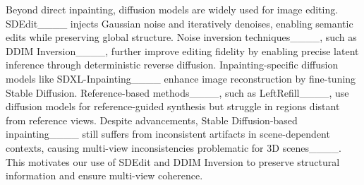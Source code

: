 
\vspace{3pt}
Beyond direct inpainting, diffusion models are widely used for image editing. SDEdit____ injects Gaussian noise and iteratively denoises, enabling semantic edits while preserving global structure. Noise inversion techniques____, such as DDIM Inversion____, further improve editing fidelity by enabling precise latent inference through deterministic reverse diffusion.
Inpainting-specific diffusion models like SDXL-Inpainting____ enhance image reconstruction by fine-tuning Stable Diffusion. Reference-based methods____, such as LeftRefill____, use diffusion models for reference-guided synthesis but struggle in regions distant from reference views.
Despite advancements, Stable Diffusion-based inpainting____ still suffers from inconsistent artifacts in scene-dependent contexts, causing multi-view inconsistencies problematic for 3D scenes____. This motivates our use of SDEdit and DDIM Inversion to preserve structural information and ensure multi-view coherence.

